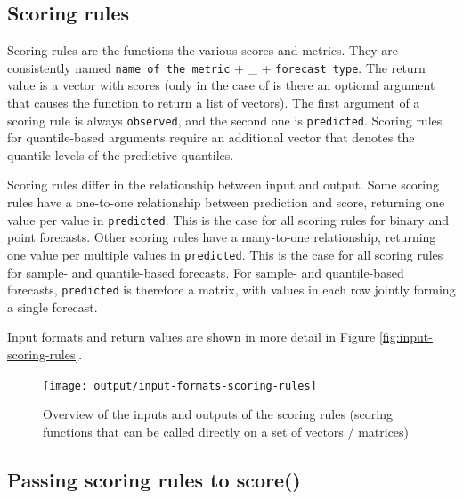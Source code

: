 \documentclass[
]{jss}
\begin{document}
\subsection{Scoring rules}\label{scoring-rules}

Scoring rules are the functions the various scores and metrics. They are
consistently named \texttt{name\ of\ the\ metric} + \_ +
\texttt{forecast\ type}. The return value is a vector with scores (only
in the case of  is there an optional argument that causes
the function to return a list of vectors). The first argument of a
scoring rule is always \texttt{observed}, and the second one is
\texttt{predicted}. Scoring rules for quantile-based arguments require
an additional vector that denotes the quantile levels of the predictive
quantiles.

Scoring rules differ in the relationship between input and output. Some
scoring rules have a one-to-one relationship between prediction and
score, returning one value per value in \texttt{predicted}. This is the
case for all scoring rules for binary and point forecasts. Other scoring
rules have a many-to-one relationship, returning one value per multiple
values in \texttt{predicted}. This is the case for all scoring rules for
sample- and quantile-based forecasts. For sample- and quantile-based
forecasts, \texttt{predicted} is therefore a matrix, with values in each
row jointly forming a single forecast.

Input formats and return values are shown in more detail in Figure
\ref{fig:input-scoring-rules}.

\begin{CodeChunk}
\begin{figure}[!h]

{\centering \texttt{[image: output/input-formats-scoring-rules]} 

}

\caption[Overview of the inputs and outputs of the scoring rules (scoring functions that can be called directly on a set of vectors / matrices)]{Overview of the inputs and outputs of the scoring rules (scoring functions that can be called directly on a set of vectors / matrices)}\label{fig:inputs-scoring-rules}
\end{figure}
\end{CodeChunk}

\subsection{Passing scoring rules to
score()}\label{passing-scoring-rules-to-score}
\end{document}
